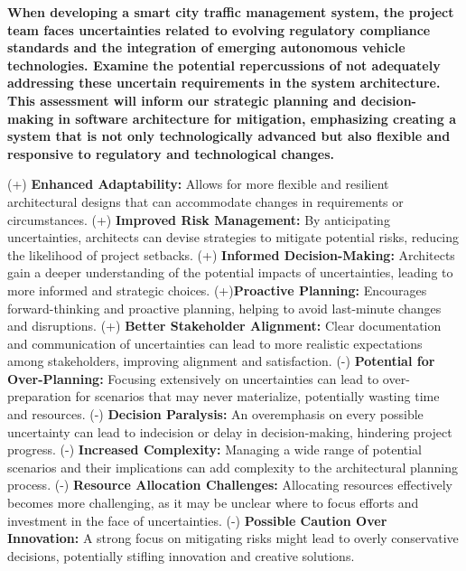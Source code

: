  \textbf{\textcolor{mycolorgreen}{When developing a smart city traffic management system,} \textcolor{mycolorblue}{the project team faces uncertainties related to evolving regulatory compliance standards and the integration of emerging autonomous vehicle technologies.}  Examine the potential repercussions of not adequately addressing these uncertain requirements in the system architecture. This assessment will inform our strategic planning and decision-making in software architecture for mitigation, emphasizing creating a system that is not only technologically advanced but also flexible and responsive to regulatory and technological changes.}

\newline
\textcolor{mycolorblue}{(+)} \textbf{Enhanced Adaptability:} Allows for more flexible and resilient architectural designs that can accommodate changes in requirements or circumstances. \newline
\textcolor{mycolorblue}{(+)} \textbf{Improved Risk Management:} By anticipating uncertainties, architects can devise strategies to mitigate potential risks, reducing the likelihood of project setbacks. \newline
\textcolor{mycolorblue}{(+)} \textbf{Informed Decision-Making:} Architects gain a deeper understanding of the potential impacts of uncertainties, leading to more informed and strategic choices. \newline
\textcolor{mycolorblue}{(+)}\textbf{Proactive Planning:} Encourages forward-thinking and proactive planning, helping to avoid last-minute changes and disruptions. \newline
\textcolor{mycolorblue}{(+)} \textbf{Better Stakeholder Alignment: }Clear documentation and communication of uncertainties can lead to more realistic expectations among stakeholders, improving alignment and satisfaction. \newline
\textcolor{mycolorred}{(-)} \textbf{Potential for Over-Planning:} Focusing extensively on uncertainties can lead to over-preparation for scenarios that may never materialize, potentially wasting time and resources. \newline
\textcolor{mycolorred}{(-)} \textbf{Decision Paralysis:} An overemphasis on every possible uncertainty can lead to indecision or delay in decision-making, hindering project progress. \newline
\textcolor{mycolorred}{(-)} \textbf{Increased Complexity:} Managing a wide range of potential scenarios and their implications can add complexity to the architectural planning process. \newline
\textcolor{mycolorred}{(-)} \textbf{Resource Allocation Challenges:} Allocating resources effectively becomes more challenging, as it may be unclear where to focus efforts and investment in the face of uncertainties. \newline
\textcolor{mycolorred}{(-)} \textbf{Possible Caution Over Innovation:} A strong focus on mitigating risks might lead to overly conservative decisions, potentially stifling innovation and creative solutions. \newline

